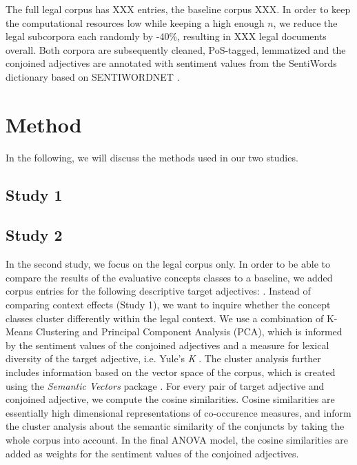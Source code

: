 \documentclass{article}
\begin{document}
The full legal corpus has XXX entries, the baseline corpus XXX. In order to keep the computational resources low while keeping a high enough $n$, we reduce the legal subcorpora each randomly by -40\%, resulting in XXX legal documents overall. Both corpora are subsequently cleaned, PoS-tagged, lemmatized and the conjoined adjectives are annotated with sentiment values from the SentiWords dictionary based on SENTIWORDNET \citep{Esuli2006, Baccianella2010, Guerini2013, Gatti2016}.

\section{Method}

In the following, we will discuss the methods used in our two studies.

\subsection{Study 1}



\subsection{Study 2}

In the second study, we focus on the legal corpus only. In order to be able to compare the results of the evaluative concepts classes to a baseline, we added corpus entries for the following descriptive target adjectives: . Instead of comparing context effects (Study 1), we want to inquire whether the concept classes cluster differently within the legal context. We use a combination of K-Means Clustering and Principal Component Analysis (PCA), which is informed by the sentiment values of the conjoined adjectives and a measure for lexical diversity of the target adjective, i.e. Yule's \textit{K} \citep{Yule1944, Tweedie1998}. The cluster analysis further includes information based on the vector space of the corpus, which is created using the \textit{Semantic Vectors} package \citep{Widdows2008, Widdows2010, Widdows2016}. For every pair of target adjective and conjoined adjective, we compute the cosine similarities. Cosine similarities are essentially high dimensional representations of co-occurence measures, and inform the cluster analysis about the semantic similarity of the conjuncts by taking the whole corpus into account. In the final ANOVA model, the cosine similarities are added as weights for the sentiment values of the conjoined adjectives.
\end{document}
